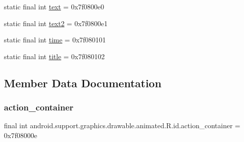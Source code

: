 \begin{DoxyCompactItemize}
\item 
static final int \mbox{\hyperlink{classandroid_1_1support_1_1graphics_1_1drawable_1_1animated_1_1R_1_1id_a771d3997393be396d7354a30b1a1ee64}{text}} = 0x7f0800e0
\item 
static final int \mbox{\hyperlink{classandroid_1_1support_1_1graphics_1_1drawable_1_1animated_1_1R_1_1id_a9d7004b820a452d0cecbbb2e1a7655f7}{text2}} = 0x7f0800e1
\item 
static final int \mbox{\hyperlink{classandroid_1_1support_1_1graphics_1_1drawable_1_1animated_1_1R_1_1id_a4c656a6a67db97db501a35937f7981a6}{time}} = 0x7f080101
\item 
static final int \mbox{\hyperlink{classandroid_1_1support_1_1graphics_1_1drawable_1_1animated_1_1R_1_1id_a47a3e5ab1364d8adba942674f7c407ad}{title}} = 0x7f080102
\end{DoxyCompactItemize}


\subsection{Member Data Documentation}
\mbox{\label{classandroid_1_1support_1_1graphics_1_1drawable_1_1animated_1_1R_1_1id_ad3a8b5e39a6727f8720761828138ad36}} 
\subsubsection{\texorpdfstring{action\+\_\+container}{action\_container}}
{\footnotesize\ttfamily final int android.\+support.\+graphics.\+drawable.\+animated.\+R.\+id.\+action\+\_\+container = 0x7f08000e\hspace{0.3cm}{\ttfamily [static]}}

\mbox{\label{classandroid_1_1support_1_1graphics_1_1drawable_1_1animated_1_1R_1_1id_a4af26dc65a6b402ba33678a7f89d8d5f}} 
